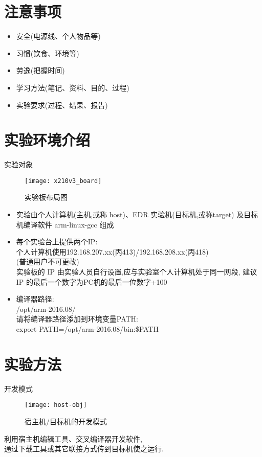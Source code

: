 \chapter{注意事项}{}
\begin{itemize}
  \item 安全(电源线、个人物品等)
  \item 习惯(饮食、环境等)
  \item 劳逸(把握时间)
  \item 学习方法(笔记、资料、目的、过程)
  \item 实验要求(过程、结果、报告)
\end{itemize}
\endslide

\chapter{实验环境介绍}{实验对象}
\begin{figure}
\centering
  \texttt{[image: x210v3\_board]}
\caption{实验板布局图}
\end{figure}
\endslide

\begin{itemize}
  \item 实验由个人计算机(主机,或称 host)、EDR 实验机(目标机,或称target)
		及目标机编译软件 arm-linux-gcc 组成
  \item 每个实验台上提供两个IP:\\
        个人计算机使用192.168.207.xx(丙413)/192.168.208.xx(丙418)\\
		(普通用户不可更改)\\
		实验板的 IP 由实验人员自行设置,应与实验室个人计算机处于同一网段,
        建议 IP 的最后一个数字为PC机的最后一位数字+100
  \item 编译器路径:\\
        /opt/arm-2016.08/\\
		请将编译器路径添加到环境变量PATH:\\
		export PATH=/opt/arm-2016.08/bin:\$PATH
\end{itemize}
\endslide

\chapter{实验方法}{开发模式}
\begin{figure}
\centering
  \texttt{[image: host-obj]}
\caption{宿主机/目标机的开发模式}
\end{figure}

利用宿主机编辑工具、交叉编译器开发软件,\\
通过下载工具或其它联接方式传到目标机使之运行.
\endslide

